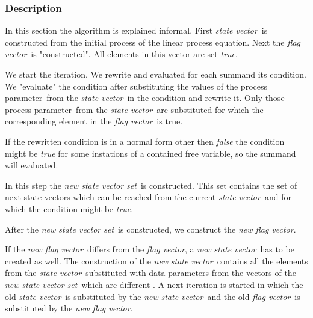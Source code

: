 \documentclass[a4paper,10pt]{article}
\newcommand{\lpe}{linear process equation}
\newcommand{\pp}{process parameter}
\newcommand{\pps}{process parameters}
\newcommand{\ti}{\textit}
\newcommand{\sv}{\textit{state vector}}
\newcommand{\fv}{\textit{flag vector}}
\newcommand{\svs}{\textit{new state vector set}}
\newcommand{\nfv}{\textit{new flag vector}}
\begin{document}
\subsubsection{Description}\label{sss:desc}
In this section the algorithm is explained informal. First \sv\ is constructed from the initial process of the \lpe . Next the \fv\ is "constructed".
All elements in this vector are set \ti{true}.

We start the iteration. We rewrite and evaluated for each summand its condition. We "evaluate" the condition after substituting the values of the \pp\ from the \sv\ in the condition and rewrite it. Only those \pp\ from the \sv\ are substituted for which the corresponding element in the \fv\ is true. 

If the rewritten condition is in a normal form other then \ti{false} the condition might be \ti{true} for some instations of a contained free variable, so the summand will evaluated. 

In this step the \svs\ is constructed. This set contains the set of next state vectors which can be reached from the current \sv\ and for which the condition might be \ti{true}. 

After the \svs\ is constructed, we construct the \nfv . 


 
If the \nfv\ differs from the \fv , a \ti{new} \sv\ has to be created as well. The construction of the \ti{new} \sv\ contains all the elements from the \sv\ substituted with data parameters from the vectors of the \svs\ which are different . 
A next iteration is started in which the old \sv\ is substituted by the \ti{new} \sv\ and the old \fv\ is substituted by the \nfv .
  
\end{document}

